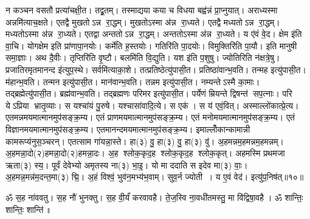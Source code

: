 न कञ्चन वसतौ प्रत्या॑चक्षी॒त। तद्व्र॒तम्। तस्माद्यया कया च विधया बह्व॑न्नं प्रा॒प्नुयात्। अराध्यस्मा अन्नमि॑त्याच॒क्षते। एतद्वै मुखतोऽन्न रा॒द्धम्। मुखतोऽस्मा अ॑न्न रा॒ध्यते। एतद्वै मध्यतोऽन्न रा॒द्धम्। मध्यतोऽस्मा अ॑न्न रा॒ध्यते। एतद्वा अन्ततोऽन्न रा॒द्धम्। अन्ततोऽस्मा अ॑न्न रा॒ध्यते। य ए॑वं वे॒द। क्षेम इ॑ति वा॒चि। योगक्षेम इति प्रा॑णापा॒नयोः। कर्मे॑ति ह॒स्तयोः। गतिरि॑ति पा॒दयोः। विमुक्तिरि॑ति पा॒यौ। इति मानुषी समा॒ज्ञाः। अथ दै॒वीः। तृप्तिरि॑ति वृ॒ष्टौ। बलमि॑ति वि॒द्युति। यश इ॑ति प॒शुषु। ज्योतिरिति न॑क्षत्रे॒षु। प्रजातिरमृतमानन्द इ॑त्युप॒स्थे। सर्वमि॑त्याका॒शे। तत्प्रतिष्ठेत्यु॑पासी॒त। प्रतिष्ठा॑वान्भ॒वति। तन्मह इत्यु॑पासी॒त। म॑हान्भ॒वति। तन्मन इत्यु॑पासी॒त। मान॑वान्भ॒वति। तन्नम इत्यु॑पासी॒त। नम्यन्तेऽस्मै का॒माः। तद्ब्रह्मेत्यु॑पासी॒त। ब्रह्म॑वान्भ॒वति। तद्ब्रह्मणः परिमर इत्यु॑पासी॒त। पर्येणं म्रियन्ते द्विषन्त॑ सप॒त्नाः। परि येऽप्रिया भ्रातृ॒व्याः। स यश्चा॑यं पु॒रुषे। यश्चासा॑वादि॒त्ये। स एक॑। स य॑ एवं॒वित्। अस्माल्लो॑कात्प्रे॒त्य। एतमन्नमयमात्मानमुप॑सङ्क्र॒म्य। एतं प्राणमयमात्मानमुप॑सङ्क्र॒म्य। एतं मनोमयमात्मानमुप॑सङ्क्र॒म्य। एतं विज्ञानमयमात्मानमुप॑\-सङ्क्र॒म्य। एतमानन्दमयमात्मानमुप॑सङ्क्र॒म्य। इमाल्लोँकान्कामान्नी कामरूप्य॑नुस॒ञ्चरन्। एतत्साम गा॑यन्ना॒स्ते। हा(३) वु॒ हा(३) वु॒ हा(३) वु॑। अ॒हमन्नम॒हमन्नम॒हमन्नम्। अ॒हमन्ना॒दो(२)\-\aav{}हमन्ना॒दो(२)\aav{}हमन्ना॒दः। अ॒ह श्लोक॒कृद॒ह श्लोक॒कृद॒ह श्लोक॒कृत्। अहमस्मि प्रथमजा ऋता(३) स्य॒। पूर्वं देवेभ्यो अमृतस्य ना(३) भा॒इ॒। यो मा ददाति स इदेव मा(३) वाः॒। अ॒हमन्न॒मन्न॑म॒दन्त॒मा(३) द्मि॒। अ॒हं  विश्वं॒ भुव॑न॒मभ्य॑भ॒वाम्। सुव॒र्न ज्योती। य ए॒वं वेद॑। इत्यु॑प॒निष॑त्॥१०॥

ॐ स॒ह ना॑ववतु। स॒ह नौ॑ भुनक्तु। स॒ह वी॒र्यं॑ करवावहै। ते॒ज॒स्वि ना॒वधी॑तमस्तु॒ मा वि॑द्विषा॒वहै। ॐ शान्तिः॒ शान्तिः॒ शान्ति॑॥

\closesection


